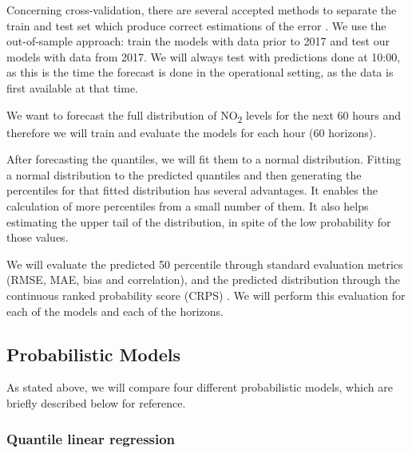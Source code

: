 \documentclass[a4paper,twocolumn,5p]{elsarticle}
\begin{document}
Concerning cross-validation, there are several accepted methods to
separate the train and test set which produce correct estimations of
the error \cite{bergmeir_note_2018}. We use the out-of-sample
approach: train the models with data prior to 2017 and test our models
with data from 2017. We will always test with predictions done at
10:00, as this is the time the forecast is done in the operational
setting, as the data is first available at that time.

We want to forecast the full distribution of NO\textsubscript{2}
levels for the next 60 hours and therefore we will train and evaluate
the models for each hour (60 horizons).

After forecasting the quantiles, we will fit them to a normal
distribution. Fitting a normal distribution to the predicted quantiles
and then generating the percentiles for that fitted distribution has
several advantages. It enables the calculation of more percentiles
from a small number of them.  It also helps estimating the upper tail
of the distribution, in spite of the low probability for those values.

We will evaluate the predicted 50 percentile through standard
evaluation metrics (RMSE, MAE, bias and correlation), and the predicted
distribution through the continuous ranked probability score (CRPS)
. We will perform this evaluation for
each of the models and each of the horizons.

\subsection{Probabilistic Models}
\label{sec:models}

As stated above, we will compare four different probabilistic models,
which are briefly described below for reference.


\subsubsection{Quantile linear regression}
\end{document}
